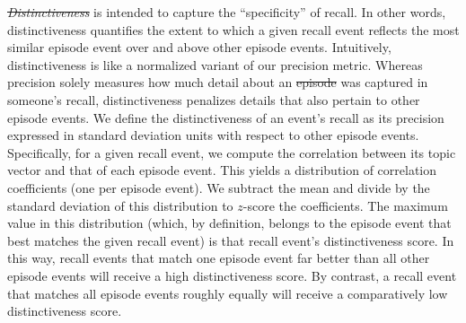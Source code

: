\documentclass[10pt]{article}
\renewcommand{\includegraphics}[2][]{} %
\providecommand{\DIFaddtex}[1]{{\protect\color{blue}\uwave{#1}}} %
\providecommand{\DIFdeltex}[1]{{\protect\color{red}\sout{#1}}}                      %
\providecommand{\DIFaddbegin}{} %
\providecommand{\DIFaddend}{} %
\providecommand{\DIFdelbegin}{} %
\providecommand{\DIFdelend}{} %
\providecommand{\DIFadd}[1]{\texorpdfstring{\DIFaddtex{#1}}{#1}} %
\providecommand{\DIFdel}[1]{\texorpdfstring{\DIFdeltex{#1}}{}} %
\newcommand{\DIFscaledelfig}{0.5}
\newlength{\DIFdelgraphicswidth} %
\newlength{\DIFdelgraphicsheight} %
\newcommand{\DIFaddincludegraphics}[2][]{{\color{blue}\fbox{\DIFOincludegraphics[#1]{#2}}}} %
\newcommand{\DIFdelincludegraphics}[2][]{%
\sbox{\DIFdelgraphicsbox}{\DIFOincludegraphics[#1]{#2}}%
\settoboxwidth{\DIFdelgraphicswidth}{\DIFdelgraphicsbox} %
\settoboxtotalheight{\DIFdelgraphicsheight}{\DIFdelgraphicsbox} %
\scalebox{\DIFscaledelfig}{%
\parbox[b]{\DIFdelgraphicswidth}{\usebox{\DIFdelgraphicsbox}\\[-\baselineskip] \rule{\DIFdelgraphicswidth}{0em}}\llap{\resizebox{\DIFdelgraphicswidth}{\DIFdelgraphicsheight}{%
\setlength{\unitlength}{\DIFdelgraphicswidth}%
\begin{picture}(1,1)%
\thicklines\linethickness{2pt} %
{\color[rgb]{1,0,0}\put(0,0){\framebox(1,1){}}}%
{\color[rgb]{1,0,0}\put(0,0){\line( 1,1){1}}}%
{\color[rgb]{1,0,0}\put(0,1){\line(1,-1){1}}}%
\end{picture}%
}\hspace*{3pt}}} %
} %
\DeclareRobustCommand{\DIFaddbegin}{\DIFOaddbegin \let\includegraphics\DIFaddincludegraphics} %
\DeclareRobustCommand{\DIFaddend}{\DIFOaddend \let\includegraphics\DIFOincludegraphics} %
\DeclareRobustCommand{\DIFdelbegin}{\DIFOdelbegin \let\includegraphics\DIFdelincludegraphics} %
\DeclareRobustCommand{\DIFdelend}{\DIFOaddend \let\includegraphics\DIFOincludegraphics} %
\begin{document}
\DIFdelbegin \textit{\DIFdel{Distinctiveness}} %
\DIFdelend \DIFaddbegin \DIFadd{Distinctiveness }\DIFaddend is intended to capture the ``specificity'' of recall.  In other words, distinctiveness quantifies the extent to which a given recall event reflects the most similar episode event over and above other episode events.  Intuitively, distinctiveness is like a normalized variant of our precision metric.  Whereas precision solely measures how much detail about an \DIFdelbegin \DIFdel{episode }\DIFdelend \DIFaddbegin \DIFadd{event }\DIFaddend was captured in someone's recall, distinctiveness penalizes details that also pertain to other episode events.  We define the distinctiveness of an event's recall as its precision expressed in standard deviation units with respect to other episode events.  Specifically, for a given recall event, we compute the correlation between its topic vector and that of each episode event.  This yields a distribution of correlation coefficients (one per episode event).  We subtract the mean and divide by the standard deviation of this distribution to $z$-score the coefficients.  The maximum value in this distribution (which, by definition, belongs to the episode event that best matches the given recall event) is that recall event's distinctiveness score.  In this way, recall events that match one episode event far better than all other episode events will receive a high distinctiveness score.  By contrast, a recall event that matches all episode events roughly equally will receive a comparatively low distinctiveness score.
\end{document}
